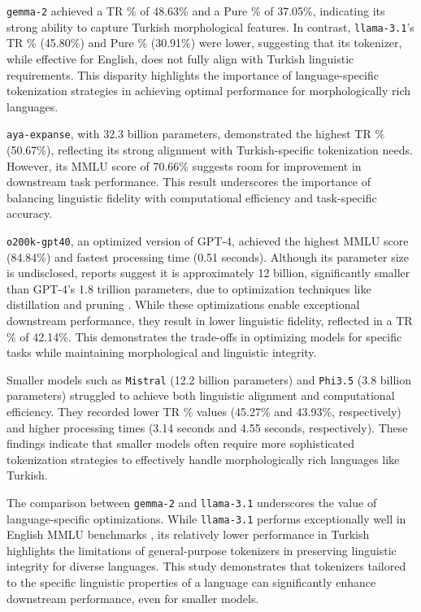 \documentclass{article}
\begin{document}
  \texttt{gemma-2} achieved a TR \% of 48.63\% and a Pure \% of 37.05\%, indicating its strong ability to capture Turkish morphological features. In contrast, \texttt{llama-3.1}'s TR \% (45.80\%) and Pure \% (30.91\%) were lower, suggesting that its tokenizer, while effective for English, does not fully align with Turkish linguistic requirements. This disparity highlights the importance of language-specific tokenization strategies in achieving optimal performance for morphologically rich languages.
  
  \texttt{aya-expanse}, with 32.3 billion parameters, demonstrated the highest TR \% (50.67\%), reflecting its strong alignment with Turkish-specific tokenization needs. However, its MMLU score of 70.66\% suggests room for improvement in downstream task performance. This result underscores the importance of balancing linguistic fidelity with computational efficiency and task-specific accuracy.
  
  \texttt{o200k-gpt40}, an optimized version of GPT-4, achieved the highest MMLU score (84.84\%) and fastest processing time (0.51 seconds). Although its parameter size is undisclosed, reports suggest it is approximately 12 billion, significantly smaller than GPT-4's 1.8 trillion parameters, due to optimization techniques like distillation and pruning \cite{lacy_gpt-4o_2024,shakrapani_gpt_nodate}. While these optimizations enable exceptional downstream performance, they result in lower linguistic fidelity, reflected in a TR \% of 42.14\%. This demonstrates the trade-offs in optimizing models for specific tasks while maintaining morphological and linguistic integrity.
  
  Smaller models such as \texttt{Mistral} (12.2 billion parameters) and \texttt{Phi3.5} (3.8 billion parameters) struggled to achieve both linguistic alignment and computational efficiency. They recorded lower TR \% values (45.27\% and 43.93\%, respectively) and higher processing times (3.14 seconds and 4.55 seconds, respectively). These findings indicate that smaller models often require more sophisticated tokenization strategies to effectively handle morphologically rich languages like Turkish.
  
  The comparison between \texttt{gemma-2} and \texttt{llama-3.1} underscores the value of language-specific optimizations. While \texttt{llama-3.1} performs exceptionally well in English MMLU benchmarks \cite{ai_llama_nodate}, its relatively lower performance in Turkish highlights the limitations of general-purpose tokenizers in preserving linguistic integrity for diverse languages. This study demonstrates that tokenizers tailored to the specific linguistic properties of a language can significantly enhance downstream performance, even for smaller models.
  
\end{document}
